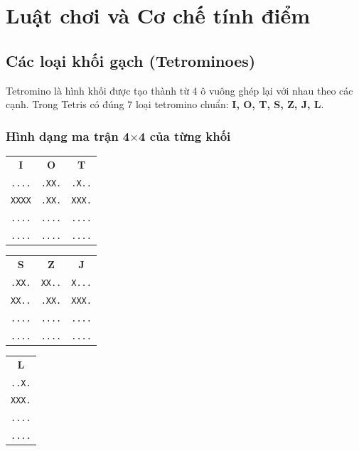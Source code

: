 \section{Luật chơi và Cơ chế tính điểm}

\subsection{Các loại khối gạch (Tetrominoes)}
Tetromino là hình khối được tạo thành từ 4 ô vuông ghép lại với nhau theo các cạnh.
Trong Tetris có đúng 7 loại tetromino chuẩn: \textbf{I, O, T, S, Z, J, L}.

\subsubsection{Hình dạng ma trận 4$\times$4 của từng khối}

\begin{center}
\begin{tabular}{ccc}
\textbf{I} & \textbf{O} & \textbf{T} \\
\texttt{....} & \texttt{.XX.} & \texttt{.X..} \\
\texttt{XXXX} & \texttt{.XX.} & \texttt{XXX.} \\
\texttt{....} & \texttt{....} & \texttt{....} \\
\texttt{....} & \texttt{....} & \texttt{....} \\
\end{tabular}
\end{center}

\begin{center}
\begin{tabular}{ccc}
\textbf{S} & \textbf{Z} & \textbf{J} \\
\texttt{.XX.} & \texttt{XX..} & \texttt{X...} \\
\texttt{XX..} & \texttt{.XX.} & \texttt{XXX.} \\
\texttt{....} & \texttt{....} & \texttt{....} \\
\texttt{....} & \texttt{....} & \texttt{....} \\
\end{tabular}
\end{center}

\begin{center}
\begin{tabular}{c}
\textbf{L} \\
\texttt{..X.} \\
\texttt{XXX.} \\
\texttt{....} \\
\texttt{....} \\
\end{tabular}
\end{center}

